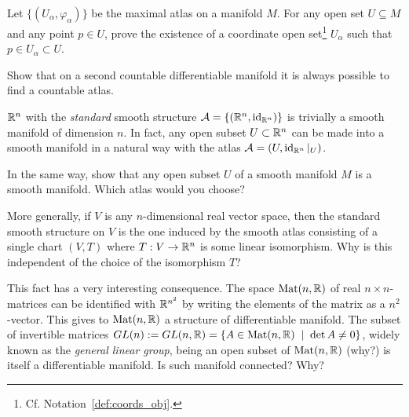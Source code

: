 \begin{exercise}
	Let $\{(U_\alpha, \varphi_\alpha)\}$ be the maximal atlas on a manifold $M$.
	For any open set $U\subseteq M$ and any point $p\in U$, prove the existence of a coordinate open set\footnote{Cf. Notation~\ref{def:coords_obj}.} $U_\alpha$ such that $p\in U_\alpha\subset U$.
\end{exercise}

\begin{exercise}
	Show that on a second countable differentiable manifold it is always possible to find a countable atlas.
\end{exercise}

\begin{exercise}\label{exe:subsetsmanifolds}
	$\mathbb{R}^n$ with the \emph{standard} smooth structure $\mathcal{A}=\{(\mathbb{R}^n, \operatorname{id}_{\mathbb{R}^n})\}$ is trivially a smooth manifold of dimension $n$.
	In fact, any open subset $U\subset\mathbb{R}^n$ can be made into a smooth manifold in a natural way with the atlas $\mathcal{A}=(U, \operatorname{id}_{\mathbb{R}^n}|_U)$.

	In the same way, show that any open subset $U$ of a smooth manifold $M$ is a smooth manifold.
	Which atlas would you choose?

	More generally, if $V$ is any $n$-dimensional real vector space, then the standard smooth structure on $V$ is the one induced by the smooth atlas consisting of a single chart $(V, T)$ where $T: V \to \mathbb{R}^n$ is some linear isomorphism.
	Why is this independent of the choice of the isomorphism $T$?

	This fact has a very interesting consequence.
	The space $\mathrm{Mat}(n, \mathbb{R})$ of real $n\times n$-matrices can be identified with $\mathbb{R}^{n^2}$ by writing the elements of the matrix as a $n^2$-vector.
	This gives to $\mathrm{Mat}(n, \mathbb{R})$ a structure of differentiable manifold.
	The subset of invertible matrices $GL(n) := GL(n, \mathbb{R}) = \{ A \in \mathrm{Mat}(n, \mathbb{R}) \;\mid\; \det A \neq 0\}$, widely known as the \emph{general linear group}, being an open subset of $\mathrm{Mat}(n, \mathbb{R})$ (why?) is itself a differentiable manifold.
	Is such manifold connected? Why?
\end{exercise}

